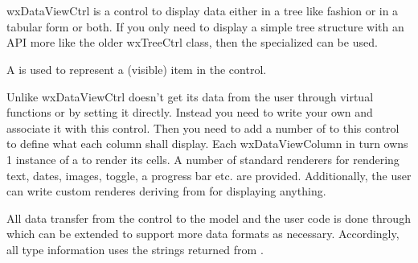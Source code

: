 \section{}\label{wxdataviewctrl}

wxDataViewCtrl is a control to display data either
in a tree like fashion or in a tabular form or both.
If you only need to display a simple tree structure
with an API more like the older wxTreeCtrl class,
then the specialized 
can be used.

A  is used
to represent a (visible) item in the control.

Unlike  wxDataViewCtrl doesn't 
get its data from the user through virtual functions or by
setting it directly. Instead you need to write your own 
 and associate
it with this control. Then you need to add a number of
 to this control to
define what each column shall display. Each wxDataViewColumn
in turn owns 1 instance of a 
 to render its
cells. A number of standard renderers for rendering text, dates,
images, toggle, a progress bar etc. are provided. Additionally,
the user can write custom renderes deriving from 
for displaying anything.

All data transfer from the control to the model and the user
code is done through  which can
be extended to support more data formats as necessary. 
Accordingly, all type information uses the strings returned
from .


\twocolwidtha{5cm}
\begin{twocollist}\itemsep=0pt
\end{twocollist}



